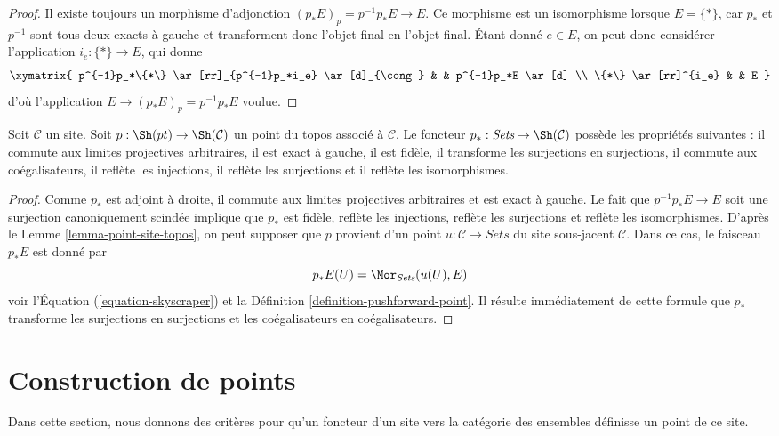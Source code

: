\begin{proof}
Il existe toujours un morphisme d’adjonction
$(p_*E)_p = p^{-1}p_*E \to E$.
Ce morphisme est un isomorphisme lorsque $E = \{*\}$, car $p_*$ et $p^{-1}$
sont tous deux exacts à gauche et transforment donc l’objet final en l’objet
final. Étant donné $e \in E$, on peut donc considérer l’application
$i_e : \{*\} \to E$, qui donne
$$
\xymatrix{
p^{-1}p_*\{*\} \ar[rr]_{p^{-1}p_*i_e} \ar[d]_{\cong} & & p^{-1}p_*E \ar[d] \\
\{*\} \ar[rr]^{i_e} & & E
}
$$
d’où l’application $E \to (p_*E)_p = p^{-1}p_*E$ voulue.
\end{proof}

\begin{lemma}
\label{lemma-skyscraper-functor-exact}
Soit $\mathcal{C}$ un site. Soit
$p : \Sh(pt) \to \Sh(\mathcal{C})$ un point du topos associé à
$\mathcal{C}$. Le foncteur $p_* : \textit{Sets} \to \Sh(\mathcal{C})$
possède les propriétés suivantes : il commute aux limites projectives
arbitraires, il est exact à gauche, il est fidèle, il transforme les
surjections en surjections, il commute aux coégalisateurs, il reflète les
injections, il reflète les surjections et il reflète les isomorphismes.
\end{lemma}

\begin{proof}
Comme $p_*$ est adjoint à droite, il commute aux limites projectives
arbitraires et est exact à gauche. Le fait que
$p^{-1}p_*E \to E$ soit une surjection canoniquement scindée implique que
$p_*$ est fidèle, reflète les injections, reflète les surjections et reflète
les isomorphismes. D’après le Lemme \ref{lemma-point-site-topos}, on peut
supposer que $p$ provient d’un point
$u : \mathcal{C} \to \textit{Sets}$ du site sous-jacent $\mathcal{C}$.
Dans ce cas, le faisceau $p_*E$ est donné par
$$
p_*E(U) = \Mor_{\textit{Sets}}(u(U), E)
$$
voir l’Équation (\ref{equation-skyscraper}) et la
Définition \ref{definition-pushforward-point}.
Il résulte immédiatement de cette formule que $p_*$ transforme les
surjections en surjections et les coégalisateurs en coégalisateurs.
\end{proof}



\section{Construction de points}
\label{section-construct-points}

\noindent
Dans cette section, nous donnons des critères pour qu’un foncteur
d’un site vers la catégorie des ensembles définisse un point de ce site.

